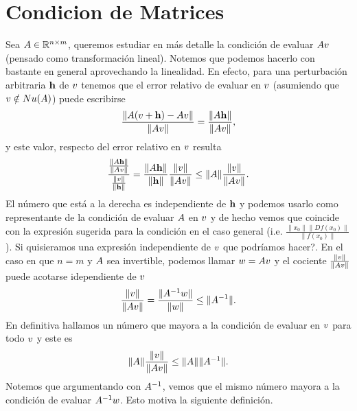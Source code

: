 \section{Condicion de Matrices}
Sea $\Ab\in \R^{n\times m}$,  queremos estudiar en más detalle la condición de evaluar $\Ab\vb$ (pensado como transformación lineal). Notemos que podemos hacerlo con bastante en general aprovechando la linealidad.
En efecto, para una perturbación arbitraria $\mathbf{h}$ de $\vb$ tenemos que el error relativo de evaluar en $\vb$ (asumiendo que $\vb\notin Nu(\Ab)$) puede escribirse
$$
\frac{\|\Ab(\vb+\hb)-\Ab\vb \|}{\|\Ab\vb\|}=\frac{\|\Ab\hb\|}{\|\Ab\vb\|},
$$
y este valor, respecto del error relativo en $\vb$ resulta
$$
\frac{\frac{\|\Ab\hb\|}{\|\Ab\vb\|}}{\frac{\|\vb\|}{\|\hb\|}}=\frac{\|\Ab\hb\|}{\|\hb\|}\frac{\|\vb\|}{\|\Ab\vb\|}\le \|\Ab\|\frac{\|\vb\|}{\|\Ab\vb\|}.
$$
El número que está a la derecha es independiente de $\mathbf{h}$ y podemos usarlo como representante de la condición de evaluar $\Ab$ en $\vb$ y de hecho vemos que  coincide con la expresión sugerida para la condición en el caso general  (i.e. $
\frac{\|x_0\|\|Df(x_0)\|}{\|f(x_0)\|}
$). Si quisieramos una expresión independiente de $\vb$ que podríamos hacer?. En el caso en que $n=m$ y $\Ab$ sea invertible, podemos llamar $\wb=\Ab\vb$ y el cociente $\frac{\|\vb\|}{\|\Ab\vb\|}$ puede acotarse idependiente de $\vb$
$$
\frac{\|\vb\|}{\|\Ab\vb\|}=
\frac{\|\Ab^{-1}\wb\|}{\|\wb\|}
\le \|\Ab^{-1}\|.$$
En definitiva hallamos un número que mayora a la condición de evaluar en $\vb$ para todo $\vb$ y este es
$$
\|\Ab\|\frac{\|\vb\|}{\|\Ab\vb\|}\le \|\Ab\|\|\Ab^{-1}\|.
$$
Notemos que argumentando con $\Ab^{-1}$, vemos que el mismo número mayora a la condición de evaluar $\Ab^{-1}\wb$. Esto motiva la siguiente definición.

